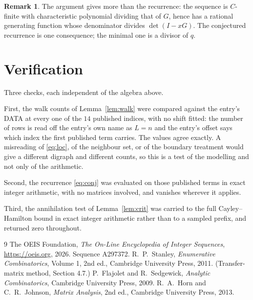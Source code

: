 \documentclass[11pt,a4paper]{article}
\theoremstyle{plain}
\theoremstyle{definition}
\newtheorem{remark}[theorem]{Remark}
\begin{document}
\begin{remark}
The argument gives more than the recurrence: the sequence is $C$-finite with characteristic
polynomial dividing that of $G$, hence has a rational generating function whose denominator
divides $\det(I-xG)$. The conjectured recurrence is one consequence; the minimal one is a
divisor of $q$.
\end{remark}

\section{Verification}

Three checks, each independent of the algebra above.

First, the walk counts of Lemma~\ref{lem:walk} were compared against the entry's DATA at
every one of the $14$ published indices, with no shift fitted: the number of rows is
read off the entry's own name as $L=n$ and the entry's offset says which index the first
published term carries. The values agree exactly. A misreading of \eqref{eq:loc}, of the
neighbour set, or of the boundary treatment would give a different digraph and different
counts, so this is a test of the modelling and not only of the arithmetic.

Second, the recurrence \eqref{eq:conj} was evaluated on those published terms in exact
integer arithmetic, with no matrices involved, and vanishes wherever it applies.

Third, the annihilation test of Lemma~\ref{lem:crit} was carried to the full
Cayley--Hamilton bound in exact integer arithmetic rather than to a sampled prefix, and
returned zero throughout.

\begin{thebibliography}{9}
 The OEIS Foundation, \emph{The On-Line Encyclopedia of Integer
Sequences}, \url{https://oeis.org}, 2026. Sequence A297372.
 R.~P.~Stanley, \emph{Enumerative Combinatorics}, Volume 1, 2nd ed.,
Cambridge University Press, 2011. (Transfer-matrix method, Section 4.7.)
 P.~Flajolet and R.~Sedgewick, \emph{Analytic Combinatorics}, Cambridge
University Press, 2009.
 R.~A.~Horn and C.~R.~Johnson, \emph{Matrix Analysis}, 2nd ed., Cambridge
University Press, 2013.
\end{thebibliography}
\end{document}
